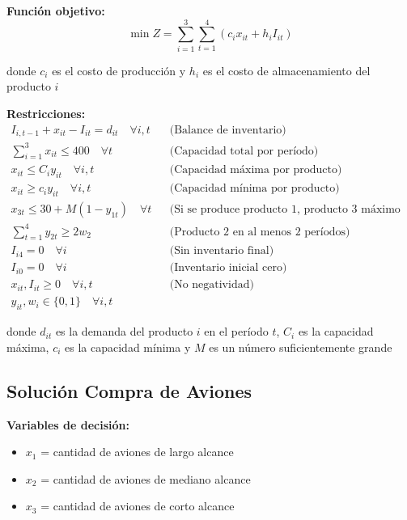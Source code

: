 \documentclass[12pt]{article}
\begin{document}
\textbf{Función objetivo:}
$$\min Z = \sum_{i=1}^{3} \sum_{t=1}^{4} (c_i x_{it} + h_i I_{it})$$
\begin{center}
donde $c_i$ es el costo de producción y $h_i$ es el costo de almacenamiento del producto $i$
\end{center}

\textbf{Restricciones:}
\begin{align*}
    I_{i,t-1} + x_{it} - I_{it} = d_{it} \quad \forall i,t && \text{(Balance de inventario)} \\
    \sum_{i=1}^{3} x_{it} \leq 400 \quad \forall t && \text{(Capacidad total por período)} \\
    x_{it} \leq C_i y_{it} \quad \forall i,t && \text{(Capacidad máxima por producto)} \\
    x_{it} \geq c_i y_{it} \quad \forall i,t && \text{(Capacidad mínima por producto)} \\
    x_{3t} \leq 30 + M(1-y_{1t}) \quad \forall t && \text{(Si se produce producto 1, producto 3 máximo 30)} \\
    \sum_{t=1}^{4} y_{2t} \geq 2w_2 && \text{(Producto 2 en al menos 2 períodos)} \\
    I_{i4} = 0 \quad \forall i && \text{(Sin inventario final)} \\
    I_{i0} = 0 \quad \forall i && \text{(Inventario inicial cero)} \\
    x_{it}, I_{it} \geq 0 \quad \forall i,t && \text{(No negatividad)} \\
    y_{it}, w_i \in \{0,1\} \quad \forall i,t
\end{align*}
\begin{center}
donde $d_{it}$ es la demanda del producto $i$ en el período $t$, $C_i$ es la capacidad máxima, $c_i$ es la capacidad mínima y $M$ es un número suficientemente grande
\end{center}

\subsection{Solución Compra de Aviones}

\textbf{Variables de decisión:}
\begin{itemize}
    \item $x_1$ = cantidad de aviones de largo alcance
    \item $x_2$ = cantidad de aviones de mediano alcance
    \item $x_3$ = cantidad de aviones de corto alcance
\end{itemize}
\end{document}
